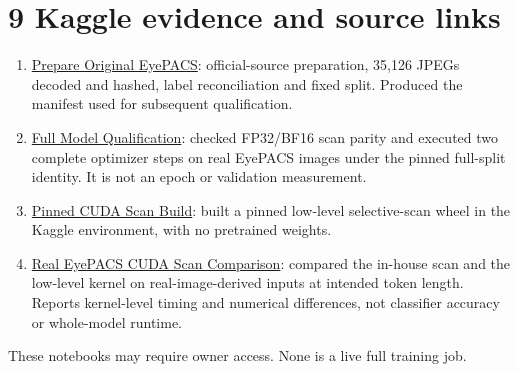 \documentclass[10pt,a4paper]{article}
\begin{document}
\section*{\color{ink}9 \quad Kaggle evidence and source links}
\begin{enumerate}
\item \href{https://www.kaggle.com/code/dharantejreddy/drvim-prepare-original-eyepacs}
{Prepare Original EyePACS}: official-source preparation, 35,126 JPEGs
decoded and hashed, label reconciliation and fixed split. Produced the
manifest used for subsequent qualification.
\item \href{https://www.kaggle.com/code/dharantejreddy/drvim-full-model-qualification}
{Full Model Qualification}: checked FP32/BF16 scan parity and executed
two complete optimizer steps on real EyePACS images under the pinned
full-split identity. It is not an epoch or validation measurement.
\item \href{https://www.kaggle.com/code/dharantejreddy/drvim-pinned-cuda-scan-build}
{Pinned CUDA Scan Build}: built a pinned low-level selective-scan wheel in
the Kaggle environment, with no pretrained weights.
\item \href{https://www.kaggle.com/code/dharantejreddy/drvim-real-eyepacs-cuda-scan-comparison}
{Real EyePACS CUDA Scan Comparison}: compared the in-house scan and the
low-level kernel on real-image-derived inputs at intended token length.
Reports kernel-level timing and numerical differences, not classifier
accuracy or whole-model runtime.
\end{enumerate}
These notebooks may require owner access. None is a live full training job.

\newpage
\end{document}
